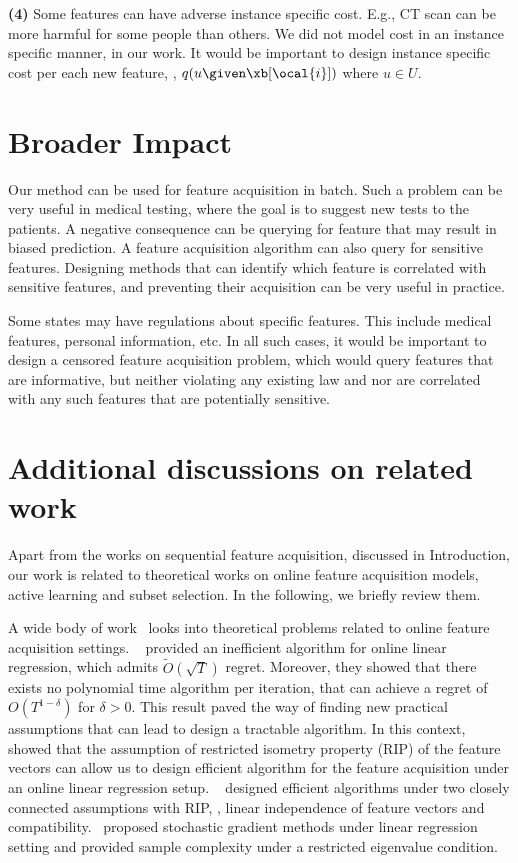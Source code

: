 \documentclass[letterpaper]{article}
\renewcommand{\cite}{\citep}
\begin{document}
\textbf{(4)} Some features can have adverse instance specific cost. E.g., CT scan can be more harmful for some people than others. We did not model cost in an instance specific manner, in our work. It would be important to design instance specific cost per each new feature, \ie, $q(u \given \xb[\ocal{i}])$ where $u\in U$.

\section{Broader Impact}
\label{app:broader}
Our method can be used for feature acquisition in batch. Such a problem can be very useful in medical testing, where the goal is to suggest new tests to the patients.
A negative consequence can be querying for feature that may result in biased prediction. A feature acquisition algorithm can also query for sensitive features. Designing methods that can identify which feature is correlated with sensitive features, and preventing their acquisition can be very useful in practice.

Some states may have regulations about specific features. This include medical features, personal information, etc. In all such cases, it would be important to design a censored feature acquisition problem, which would query features that are informative, but neither violating any existing law and nor are correlated with any such features that are potentially sensitive.

\section{Additional discussions on related work}
\label{app:related}

Apart from the works on sequential feature acquisition, discussed in Introduction, our work is related to theoretical works on online feature acquisition models, active learning and subset selection. In the following, we briefly review them.

  A wide body of work~\cite{foster2016online,kale2017adaptive,ito2017efficient,murata2018sample} looks into theoretical problems related to online feature acquisition settings.
~\citet{foster2016online} provided an inefficient algorithm for online linear regression, which admits $\tilde{O}(\sqrt{T})$ regret. Moreover, they
showed that there exists no polynomial time algorithm per iteration, that can achieve a regret of $O(T^{1-\delta})$ for $\delta>0$.  This result
paved the way of finding new practical assumptions that can lead to design a tractable algorithm.
In this context,~\citet{kale2017adaptive} showed that the assumption of restricted isometry property (RIP) of the feature vectors
can allow us to design efficient algorithm for the feature acquisition under an online linear regression setup.
~\citet{ito2017efficient} designed efficient algorithms under two closely connected assumptions with RIP, \viz,
linear independence of feature vectors and compatibility.~\citet{murata2018sample}
proposed stochastic gradient methods under linear regression setting and provided sample complexity under a restricted eigenvalue condition.
\end{document}
